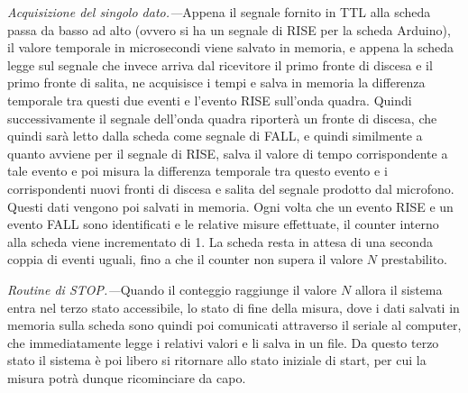 \documentclass[
    rmp,
    reprint, 
    superscriptaddress, 
    altaffilletter, 
    amsmath, 
    amssymb, 
    a4paper,
    varvw]{revtex4-2}
\begin{document}
\textit{Acquisizione del singolo dato.---}Appena il segnale fornito in TTL alla scheda passa da basso ad alto (ovvero si ha un segnale di RISE per la scheda Arduino), il valore temporale in microsecondi viene salvato in memoria, e appena la scheda legge sul segnale che invece arriva dal ricevitore il primo fronte di discesa e il primo fronte di salita, ne acquisisce i tempi e salva in memoria la differenza temporale tra questi due eventi e l'evento RISE sull'onda quadra. Quindi successivamente il segnale dell'onda quadra riporterà un fronte di discesa, che quindi sarà letto dalla scheda come segnale di FALL, e quindi similmente a quanto avviene per il segnale di RISE, salva il valore di tempo corrispondente a tale evento e poi misura la differenza temporale tra questo evento e i corrispondenti nuovi fronti di discesa e salita del segnale prodotto dal microfono. Questi dati vengono poi salvati in memoria. Ogni volta che un evento RISE e un evento FALL sono identificati e le relative misure effettuate, il counter interno alla scheda viene incrementato di 1. La scheda resta in attesa di una seconda coppia di eventi uguali, fino a che il counter non supera il valore $N$ prestabilito. 

\textit{Routine di \emph{STOP}.---}Quando il conteggio raggiunge il valore $N$ allora il sistema entra nel terzo stato accessibile, lo stato di fine della misura, dove i dati salvati in memoria sulla scheda sono quindi poi comunicati attraverso il seriale al computer, che immediatamente legge i relativi valori e li salva in un file. Da questo terzo stato il sistema è poi libero si ritornare allo stato iniziale di start, per cui la misura potrà dunque ricominciare da capo. 
\end{document}
